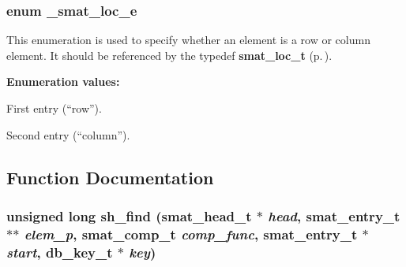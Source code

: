 \subsubsection{\setlength{\rightskip}{0pt plus 5cm}enum \_\-smat\_\-loc\_\-e}\label{group__dbprim__smat_a48}




 This enumeration is used to specify whether an element is a row or column element. It should be referenced by the typedef {\bf smat\_\-loc\_\-t} {\rm (p.\,\pageref{group__dbprim__smat_a6})}. \begin{Desc}
\item[{\bf Enumeration values:}]\par
\begin{description}
\item[
{\em SMAT\_\-LOC\_\-FIRST}\label{group__dbprim__smat_a48a102}
]First entry (``row''). \item[
{\em SMAT\_\-LOC\_\-SECOND}\label{group__dbprim__smat_a48a103}
]Second entry (``column''). \end{description}
\end{Desc}



\subsection{Function Documentation}
\subsubsection{\setlength{\rightskip}{0pt plus 5cm}unsigned long sh\_\-find ({\bf smat\_\-head\_\-t} $\ast$ {\em head}, {\bf smat\_\-entry\_\-t} $\ast$$\ast$ {\em elem\_\-p}, {\bf smat\_\-comp\_\-t} {\em comp\_\-func}, {\bf smat\_\-entry\_\-t} $\ast$ {\em start}, {\bf db\_\-key\_\-t} $\ast$ {\em key})}\label{group__dbprim__smat_a19}




